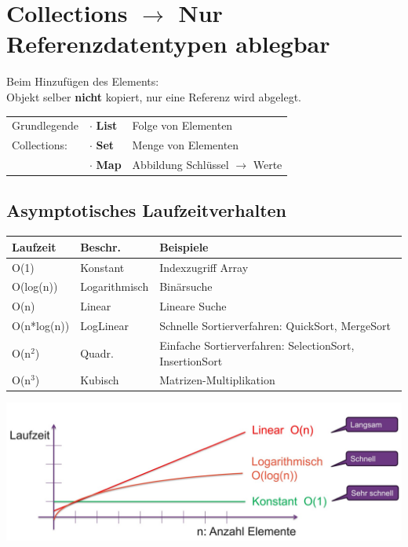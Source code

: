 {\small
\section{Collections $\rightarrow$ Nur Referenzdatentypen ablegbar}{\label{Collections}}
    Beim Hinzufügen des Elements:\\
    Objekt selber \textbf{nicht} kopiert, nur eine Referenz wird abgelegt.

    \begin{tabular}{l l l}
        Grundlegende &$\cdot$ \textbf{List} & Folge von Elementen \\
        Collections: &$\cdot$ \textbf{Set}  & Menge von Elementen \\
                    &$\cdot$ \textbf{Map}  & Abbildung Schlüssel $\rightarrow$ Werte \\
    \end{tabular}

\subsection{Asymptotisches Laufzeitverhalten}
    \begin{tabularx}{\linewidth}{l l X} \hline
        \textbf{Laufzeit} & \textbf{Beschr.} & \textbf{Beispiele} \\ \hline
        O(1)        & Konstant      & Indexzugriff Array \\
        O(log(n))   & Logarithmisch & Binärsuche \\
        O(n)        & Linear        & Lineare Suche \\
        O(n*log(n)) & LogLinear     & Schnelle Sortierverfahren: QuickSort, MergeSort \\
        O(n$^2$)    & Quadr.        & Einfache Sortierverfahren: SelectionSort, InsertionSort \\
        O(n$^3$)    & Kubisch       & Matrizen-Multiplikation \\
    \end{tabularx}
    \vspace{-0.1cm}

    \includegraphics[width=\columnwidth]{pictures/laufzeit-collections.jpg}
    \vspace{-0.5cm}

}
